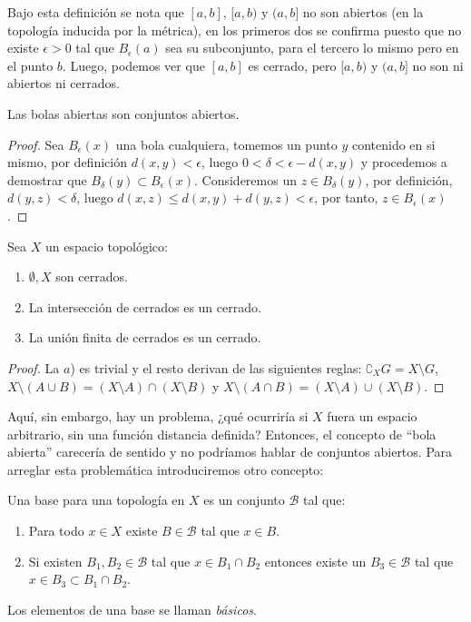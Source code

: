 \documentclass[11pt,oneside,a4paper]{book}
\begin{document}
Bajo esta definición se nota que $[a,b]$, $[a,b)$ y $(a,b]$ no son abiertos (en la topología inducida por la métrica), en los primeros dos se confirma puesto que no existe $\epsilon\gt 0$ tal que $B_\epsilon(a)$ sea su subconjunto, para el tercero lo mismo pero en el punto $b$. Luego, podemos ver que $[a,b]$ es cerrado, pero $[a,b)$ y $(a,b]$ no son ni abiertos ni cerrados.
\begin{thm}
Las bolas abiertas son conjuntos abiertos.
\end{thm}
\begin{proof}
Sea $B_\epsilon(x)$ una bola cualquiera, tomemos un punto $y$ contenido en si mismo, por definición $d(x,y)\lt\epsilon$, luego $0\lt\delta\lt\epsilon-d(x,y)$ y procedemos a demostrar que $B_\delta(y)\subset B_\epsilon(x)$. Consideremos un $z\in B_\delta(y)$, por definición, $d(y,z)\lt\delta$, luego $d(x,z)\leq d(x,y)+d(y,z)\lt\epsilon$, por tanto, $z\in B_\epsilon(x)$.
\end{proof}
\begin{thm}
Sea $X$ un espacio topológico:
\begin{enumerate}[$a$)]
\item $\emptyset,X$ son cerrados.
\item La intersección de cerrados es un cerrado.
\item La unión finita de cerrados es un cerrado.
\end{enumerate}
\end{thm}
\begin{proof}
La $a$) es trivial y el resto derivan de las siguientes reglas: $\complement_X G=X\setminus G$, $X\setminus(A\cup B)=(X\setminus A)\cap(X\setminus B)$ y $X\setminus(A\cap B)=(X\setminus A)\cup(X\setminus B)$.
\end{proof}
Aquí, sin embargo, hay un problema, ¿qué ocurriría si $X$ fuera un espacio arbitrario, sin una función distancia definida? Entonces, el concepto de ``bola abierta'' carecería de sentido y no podríamos hablar de conjuntos abiertos. Para arreglar esta problemática introduciremos otro concepto:
\begin{mydef}[Base]
Una base para una topología en $X$ es un conjunto $\mathcal{B}$ tal que:
\begin{enumerate}[(1)]
\item Para todo $x\in X$ existe $B\in\mathcal{B}$ tal que $x\in B$.
\item Si existen $B_1,B_2\in\mathcal{B}$ tal que $x\in B_1\cap B_2$ entonces existe un $B_3\in\mathcal{B}$ tal que $x\in B_3\subset B_1\cap B_2$.
\end{enumerate}
Los elementos de una base se llaman \textit{básicos}.
\end{mydef}
\end{document}

